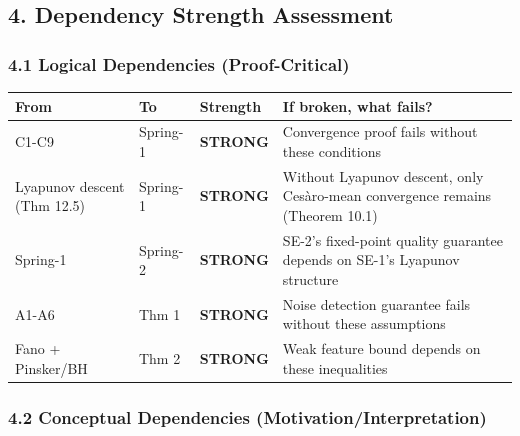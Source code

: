 \documentclass[
  12pt,
]{ctexart}
\begin{document}
\subsection{4. Dependency Strength
Assessment}\label{dependency-strength-assessment}

\subsubsection{4.1 Logical Dependencies
(Proof-Critical)}\label{logical-dependencies-proof-critical}

\begin{longtable}[]{@{}
  >{\raggedright\arraybackslash}p{}
  >{\raggedright\arraybackslash}p{}
  >{\raggedright\arraybackslash}p{}
  >{\raggedright\arraybackslash}p{}@{}}
\toprule\noalign{}
\begin{minipage}[b]{\linewidth}\raggedright
From
\end{minipage} & \begin{minipage}[b]{\linewidth}\raggedright
To
\end{minipage} & \begin{minipage}[b]{\linewidth}\raggedright
Strength
\end{minipage} & \begin{minipage}[b]{\linewidth}\raggedright
If broken, what fails?
\end{minipage} \\
\midrule\noalign{}
\endhead
\bottomrule\noalign{}
\endlastfoot
C1-C9 & Spring-1 & \textbf{STRONG} & Convergence proof fails without
these conditions \\
Lyapunov descent (Thm 12.5) & Spring-1 & \textbf{STRONG} & Without
Lyapunov descent, only Cesàro-mean convergence remains (Theorem 10.1) \\
Spring-1 & Spring-2 & \textbf{STRONG} & SE-2's fixed-point quality
guarantee depends on SE-1's Lyapunov structure \\
A1-A6 & Thm 1 & \textbf{STRONG} & Noise detection guarantee fails
without these assumptions \\
Fano + Pinsker/BH & Thm 2 & \textbf{STRONG} & Weak feature bound depends
on these inequalities \\
\end{longtable}

\subsubsection{4.2 Conceptual Dependencies
(Motivation/Interpretation)}\label{conceptual-dependencies-motivationinterpretation}
\end{document}
